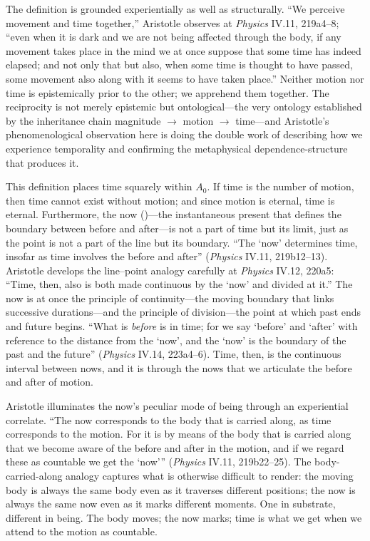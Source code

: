 The definition is grounded experientially as well as structurally. ``We perceive movement and time together,'' Aristotle observes at \textit{Physics} IV.11, 219a4--8; ``even when it is dark and we are not being affected through the body, if any movement takes place in the mind we at once suppose that some time has indeed elapsed; and not only that but also, when some time is thought to have passed, some movement also along with it seems to have taken place.'' Neither motion nor time is epistemically prior to the other; we apprehend them together. The reciprocity is not merely epistemic but ontological---the very ontology established by the inheritance chain magnitude $\to$ motion $\to$ time---and Aristotle's phenomenological observation here is doing the double work of describing how we experience temporality and confirming the metaphysical dependence-structure that produces it.

This definition places time squarely within $A_0$. If time is the number of motion, then time cannot exist without motion; and since motion is eternal, time is eternal. Furthermore, the now ()---the instantaneous present that defines the boundary between before and after---is not a part of time but its limit, just as the point is not a part of the line but its boundary. ``The `now' determines time, insofar as time involves the before and after'' (\textit{Physics} IV.11, 219b12--13). Aristotle develops the line--point analogy carefully at \textit{Physics} IV.12, 220a5: ``Time, then, also is both made continuous by the `now' and divided at it.'' The now is at once the principle of continuity---the moving boundary that links successive durations---and the principle of division---the point at which past ends and future begins. ``What is \textit{before} is in time; for we say `before' and `after' with reference to the distance from the `now', and the `now' is the boundary of the past and the future'' (\textit{Physics} IV.14, 223a4--6). Time, then, is the continuous interval between nows, and it is through the nows that we articulate the before and after of motion.

Aristotle illuminates the now's peculiar mode of being through an experiential correlate. ``The now corresponds to the body that is carried along, as time corresponds to the motion. For it is by means of the body that is carried along that we become aware of the before and after in the motion, and if we regard these as countable we get the `now''' (\textit{Physics} IV.11, 219b22--25). The body-carried-along analogy captures what is otherwise difficult to render: the moving body is always the same body even as it traverses different positions; the now is always the same now even as it marks different moments. One in substrate, different in being. The body moves; the now marks; time is what we get when we attend to the motion as countable.

